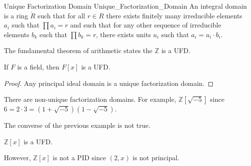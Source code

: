 \documentclass{article}                                                        %
\begin{document}
        \begin{fdefinition}{Unique Factorization Domain}
                           {Unique_Factorization_Domain}
            An integral domain is a ring $\ring{R}$ such that for all $r\in{R}$
            there exists finitely many irreducible elements $a_{i}$ such that
            $\prod{a}_{i}=r$ and such that for any other sequence of irreducible
            elements $b_{k}$ such that $\prod{b}_{k}=r$, there exists units
            $u_{i}$ such that $a_{i}=u_{i}\cdot{b}_{i}$.
        \end{fdefinition}
        \begin{example}
            The fundamental theorem of arithmetic states the $\mathbb{Z}$ is a
            UFD.
        \end{example}
        \begin{theorem}
            If $F$ is a field, then $F[x]$ is a UFD.
        \end{theorem}
        \begin{proof}
            Any principal ideal domain is a unique factorization domain.
        \end{proof}
        \begin{example}
            There are non-unique factorization domains. For example,
            $\mathbb{Z}[\sqrt{\minus{5}}]$ since
            $6=2\cdot{3}=(1+\sqrt{\minus{5}})(1-\sqrt{\minus{5}})$.
        \end{example}
        The converse of the previous example is not true.
        \begin{theorem}
            $\mathbb{Z}[x]$ is a UFD.
        \end{theorem}
        However, $\mathbb{Z}[x]$ is not a PID since $(2,x)$ is not principal.
\end{document}
